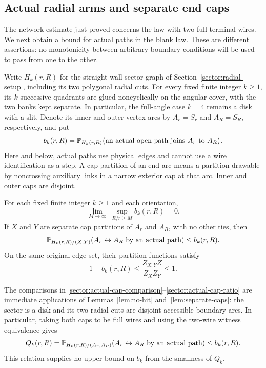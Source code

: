 \subsection{Actual radial arms and separate end caps}
\label{sector:actual-subsection}

The network estimate just proved concerns the law with two full terminal
wires.  We next obtain a bound for actual paths in the blank law.  These
are different assertions: no monotonicity between arbitrary boundary
conditions will be used to pass from one to the other.

Write $H_k(r,R)$ for the straight-wall sector graph of
Section~\ref{sector:radial-setup}, including its two polygonal radial
cuts.  For every fixed
finite integer $k\ge1$, its $k$ successive quadrants are glued
noncyclically on the angular cover, with the two banks kept separate.
In particular, the full-angle case $k=4$ remains a disk with a slit.
Denote its inner and outer vertex arcs by
$A_r=S_r$ and $A_R=S_R$, respectively, and put
\[
 b_k(r,R)=\mathbb P_{H_k(r,R)}
 \bigl(\text{an actual open path joins $A_r$ to $A_R$}\bigr).
\]
Here and below, actual paths use physical edges and cannot use a wire
identification as a step.  A cap partition of an end arc means a
partition drawable by noncrossing auxiliary links in a narrow exterior
cap at that arc.  Inner and outer caps are disjoint.

\begin{proposition}
\label{prop:sector-actual}
For each fixed finite integer $k\ge1$ and each orientation,
\[
 \lim_{M\longrightarrow\infty}\ 
 \sup_{R/r\ge M} b_k(r,R)=0.
\]
If $X$ and $Y$ are separate cap partitions of $A_r$ and $A_R$, with no
other ties, then
\begin{equation}
\label{sector:actual-cap-comparison}
 \mathbb P_{H_k(r,R)/(X,Y)}(A_r\leftrightarrow A_R
       \text{ by an actual path})\le b_k(r,R).
\end{equation}
On the same original edge set, their partition functions satisfy
\begin{equation}
\label{sector:actual-cap-ratio}
 1-b_k(r,R)\le
 \frac{Z_{X,Y}Z}{Z_XZ_Y}\le1.
\end{equation}
\end{proposition}

The comparisons in
\eqref{sector:actual-cap-comparison}--\eqref{sector:actual-cap-ratio}
are immediate applications of Lemmas~\ref{lem:no-hit}
and~\ref{lem:separate-caps}: the sector is a disk and its two radial
cuts are disjoint accessible boundary arcs.  In particular, taking both
caps to be full wires and using the two-wire witness equivalence gives
\[
 Q_k(r,R)
 =\mathbb P_{H_k(r,R)/(A_r,A_R)}
       (A_r\leftrightarrow A_R\text{ by an actual path})
 \le b_k(r,R).
\]
This relation supplies no upper bound on $b_k$ from the smallness of
$Q_k$.

